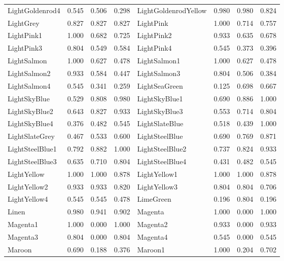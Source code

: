 {\begin{center}
\begin{tabular}{|l|l|l|l|l|l|l|l|}
LightGoldenrod4     & 0.545 & 0.506 & 0.298 & LightGoldenrodYellow& 0.980 & 0.980 & 0.824 \\ 
LightGrey           & 0.827 & 0.827 & 0.827 & LightPink           & 1.000 & 0.714 & 0.757 \\ 
LightPink1          & 1.000 & 0.682 & 0.725 & LightPink2          & 0.933 & 0.635 & 0.678 \\ 
LightPink3          & 0.804 & 0.549 & 0.584 & LightPink4          & 0.545 & 0.373 & 0.396 \\ 
LightSalmon         & 1.000 & 0.627 & 0.478 & LightSalmon1        & 1.000 & 0.627 & 0.478 \\ 
LightSalmon2        & 0.933 & 0.584 & 0.447 & LightSalmon3        & 0.804 & 0.506 & 0.384 \\ 
LightSalmon4        & 0.545 & 0.341 & 0.259 & LightSeaGreen       & 0.125 & 0.698 & 0.667 \\ 
LightSkyBlue        & 0.529 & 0.808 & 0.980 & LightSkyBlue1       & 0.690 & 0.886 & 1.000 \\ 
LightSkyBlue2       & 0.643 & 0.827 & 0.933 & LightSkyBlue3       & 0.553 & 0.714 & 0.804 \\ 
LightSkyBlue4       & 0.376 & 0.482 & 0.545 & LightSlateBlue      & 0.518 & 0.439 & 1.000 \\ 
LightSlateGrey      & 0.467 & 0.533 & 0.600 & LightSteelBlue      & 0.690 & 0.769 & 0.871 \\ 
LightSteelBlue1     & 0.792 & 0.882 & 1.000 & LightSteelBlue2     & 0.737 & 0.824 & 0.933 \\ 
LightSteelBlue3     & 0.635 & 0.710 & 0.804 & LightSteelBlue4     & 0.431 & 0.482 & 0.545 \\ 
LightYellow         & 1.000 & 1.000 & 0.878 & LightYellow1        & 1.000 & 1.000 & 0.878 \\ 
LightYellow2        & 0.933 & 0.933 & 0.820 & LightYellow3        & 0.804 & 0.804 & 0.706 \\ 
LightYellow4        & 0.545 & 0.545 & 0.478 & LimeGreen           & 0.196 & 0.804 & 0.196 \\ 
Linen               & 0.980 & 0.941 & 0.902 & Magenta             & 1.000 & 0.000 & 1.000 \\ 
Magenta1            & 1.000 & 0.000 & 1.000 & Magenta2            & 0.933 & 0.000 & 0.933 \\ 
Magenta3            & 0.804 & 0.000 & 0.804 & Magenta4            & 0.545 & 0.000 & 0.545 \\ 
Maroon              & 0.690 & 0.188 & 0.376 & Maroon1             & 1.000 & 0.204 & 0.702 \\ 

\end{tabular}
\end{center}}
